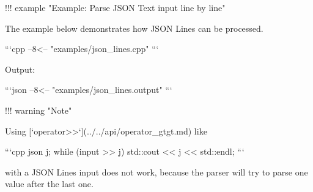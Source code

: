 !!! example "{}\+Example:\+ Parse JSON Text input line by line"{} \begin{DoxyVerb}The example below demonstrates how JSON Lines can be processed.

```cpp
--8<-- "examples/json_lines.cpp"
```

Output:

```json
--8<-- "examples/json_lines.output"
```
\end{DoxyVerb}


!!! warning "{}\+Note"{} \begin{DoxyVerb}Using [`operator>>`](../../api/operator_gtgt.md) like

```cpp
json j;
while (input >> j)
{
    std::cout << j << std::endl;
}
```

with a JSON Lines input does not work, because the parser will try to parse one value after the last one.
\end{DoxyVerb}
 